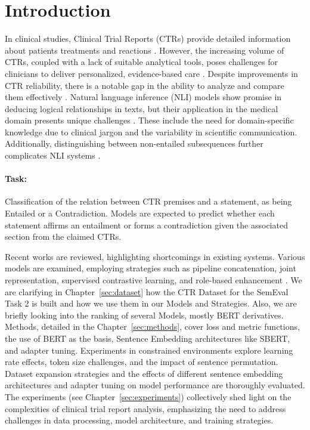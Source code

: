 \section{Introduction}\label{sec:introduction}



In clinical studies, Clinical Trial Reports (CTRs) provide detailed information about patients
treatments and reactions \cite{noauthor_nli4ct_nodate} \cite{jullien_nli4ct_2023}. 
However, the increasing volume of CTRs, coupled with a lack of suitable 
analytical tools, poses challenges for clinicians to deliver personalized, evidence-based care \cite{takehana_stanford_2023}\cite{wang_knowcomp_2023}. 
Despite improvements in CTR reliability, there is a notable gap in the ability to analyze and compare them effectively \cite{vladika_sebis_2023}. 
Natural language inference (NLI) models show promise in deducing logical relationships in texts, but their application 
in the medical domain presents unique challenges \cite{wang_knowcomp_2023}\cite{alissa_just-km_2023}\cite{rajamanickam_i2r_2023}\cite{takehana_stanford_2023}\cite{vladika_sebis_2023}. 
These include the need for domain-specific knowledge due to clinical 
jargon and the variability in scientific communication. Additionally, distinguishing between non-entailed subsequences 
further complicates NLI systems \cite{noauthor_nli4ct_nodate}.


\paragraph{\textbf{Task:}} Classification of the relation between CTR premises and a 
statement, as being Entailed or a Contradiction. Models are expected to predict whether 
each statement affirms an entailment or forms a contradiction given the associated 
section from the claimed CTRs.


Recent works are reviewed, highlighting shortcomings in existing systems. 
Various models are examined, employing strategies such as pipeline concatenation, 
joint representation, supervised contrastive learning, and role-based enhancement \cite{wang_knowcomp_2023}\cite{alissa_just-km_2023}\cite{vladika_sebis_2023}\cite{zhou_thifly_2023}.
We are clarifying in Chapter~\ref{sec:dataset} how the CTR Dataset for the SemEval Task 2
is built and how we use them in our Models and Strategies. Also, we are briefly looking into the 
ranking of several Models, mostly BERT derivatives.
Methods, detailed in the Chapter~\ref{sec:methods}, cover loss and metric functions, 
the use of BERT as the basis, Sentence Embedding architectures 
like SBERT, and adapter tuning. Experiments in constrained environments 
explore learning rate effects, token size challenges, and the impact of sentence 
permutation. Dataset expansion strategies and the effects of different sentence 
embedding architectures and adapter tuning on model performance are thoroughly evaluated.
The experiments (see Chapter~\ref{sec:experiments}) collectively shed light on the complexities of clinical trial report analysis, 
emphasizing the need to address challenges in data processing, model architecture, and training 
strategies.







